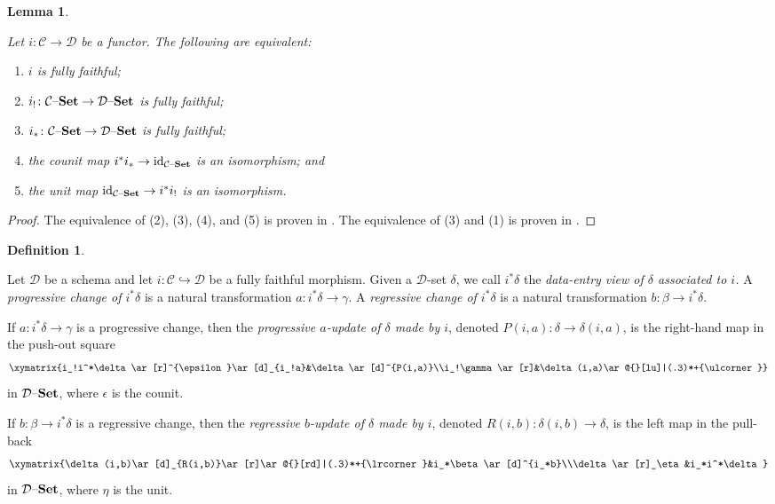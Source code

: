 \documentclass{amsart}
\makeatletter
\def\tn{\textnormal}
\def\mc{\mathcal}
\def\to{\rightarrow}
\def\taking{\colon}
\def\inj{\hookrightarrow}
\def\ullimit{\ar@{}[rd]|(.3)*+{\lrcorner}}
\def\lrlimit{\ar@{}[lu]|(.3)*+{\ulcorner}}
\def\id{\tn{id}}
\def\set{{\text \textendash}{\bf Set}}
\def\mcC{\mc{C}}
\def\mcD{\mc{D}}
\newtheorem{lemma}[theorem]{Lemma}
\theoremstyle{remark}
\theoremstyle{definition}
\newtheorem{definition}[theorem]{Definition}
\makeatother
\begin{document}
\begin{lemma}\label{lemma:fffunctors}

Let $i\taking\mcC\to\mcD$ be a functor.  The following are equivalent:\begin{enumerate}\item $i$ is fully faithful;\item $i_!\taking\mcC\set\to\mcD\set$ is fully faithful; \item $i_*\taking\mcC\set\to\mcD\set$ is fully faithful;\item the counit map $i^*i_*\to\id_{\mcC\set}$ is an isomorphism; and \item the unit map $\id_{\mcC\set}\to i^*i_!$ is an isomorphism.\end{enumerate}

\end{lemma}

\begin{proof}

The equivalence of (2), (3), (4), and (5) is proven in \cite[Lemma VII.4.1]{MM}.  The equivalence of (3) and (1) is proven in \cite[Section VII.4]{MM}.

\end{proof}

\begin{definition}\label{def:prog reg change}

Let $\mcD$ be a schema and let $i\taking\mcC\inj\mcD$ be a fully faithful morphism.  Given a $\mcD$-set $\delta$, we call $i^*\delta$ the {\em data-entry view of $\delta$ associated to $i$.}  A {\em progressive change of $i^*\delta$} is a natural transformation $a\taking i^*\delta\to \gamma$.  A {\em regressive change of $i^*\delta$} is a natural transformation $b\taking\beta\to i^*\delta$.

If $a\taking i^*\delta\to\gamma$ is a progressive change, then the {\em progressive $a$-update of $\delta$ made by $i$}, denoted $P(i,a)\taking\delta\to\delta(i,a)$, is the right-hand map in the push-out square \begin{align}\label{dia:progressive}\xymatrix{i_!i^*\delta\ar[r]^{\epsilon}\ar[d]_{i_!a}&\delta\ar[d]^{P(i,a)}\\i_!\gamma\ar[r]&\delta(i,a)\lrlimit}\end{align} in $\mcD\set$, where $\epsilon$ is the counit.

If $b\taking\beta\to i^*\delta$ is a regressive change, then the {\em regressive $b$-update of $\delta$ made by $i$}, denoted $R(i,b)\taking\delta(i,b)\to\delta$, is the left map in the pull-back \begin{align}\label{dia:regressive}\xymatrix{\delta(i,b)\ar[d]_{R(i,b)}\ar[r]\ullimit&i_*\beta\ar[d]^{i_*b}\\\delta\ar[r]_\eta&i_*i^*\delta}\end{align} in $\mcD\set$, where $\eta$ is the unit.

\end{definition}
\end{document}
